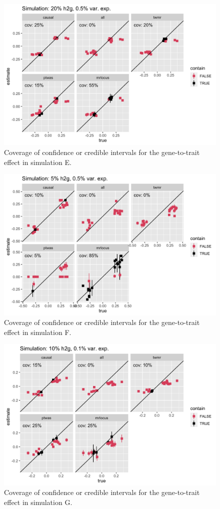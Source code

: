 \documentclass[11pt]{article}
\begin{document}
\begin{figure}[!ht]
  \centering
  \includegraphics[width=.8\textwidth]{figs/cover6.png}
  \caption{Coverage of confidence or credible intervals for the
    gene-to-trait effect in simulation E.}
\end{figure}

\begin{figure}[!ht]
  \centering
  \includegraphics[width=.8\textwidth]{figs/cover8.png}
  \caption{Coverage of confidence or credible intervals for the
    gene-to-trait effect in simulation F.}
\end{figure}

\begin{figure}[!ht]
  \centering
  \includegraphics[width=.8\textwidth]{figs/cover5.png}
  \caption{Coverage of confidence or credible intervals for the
    gene-to-trait effect in simulation G.}
\end{figure}
\end{document}
